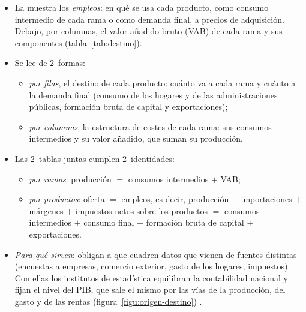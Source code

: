 \documentclass[11pt]{article}
\begin{document}
\begin{itemize}
\item La  muestra los \emph{empleos}: en qué se usa cada producto, como consumo intermedio de cada rama o como demanda final, a precios de adquisición. Debajo, por columnas, el valor añadido bruto (VAB) de cada rama y sus componentes (tabla~\ref{tab:destino}).
\item Se lee de 2~formas:
  \begin{itemize}
  \item \emph{por filas}, el destino de cada producto: cuánto va a cada rama y cuánto a la demanda final (consumo de los hogares y de las administraciones públicas, formación bruta de capital y exportaciones);
  \item \emph{por columnas}, la estructura de costes de cada rama: sus consumos intermedios y su valor añadido, que suman su producción.
  \end{itemize}
\item Las 2~tablas juntas cumplen 2~identidades\nocite{Eurostat2013SEC2010}:
  \begin{itemize}
  \item \emph{por ramas}: producción $=$ consumos intermedios $+$ VAB;
  \item \emph{por productos}: oferta $=$ empleos, es decir, producción $+$ importaciones $+$ márgenes $+$ impuestos netos sobre los productos $=$ consumos intermedios $+$ consumo final $+$ formación bruta de capital $+$ exportaciones.
  \end{itemize}
\item \emph{Para qué sirven}: obligan a que cuadren datos que vienen de fuentes distintas (encuestas a empresas, comercio exterior, gasto de los hogares, impuestos). Con ellas los institutos de estadística equilibran la contabilidad nacional y fijan el nivel del PIB, que sale el mismo por las vías de la producción, del gasto y de las rentas (figura~\ref{figu:origen-destino}) .
\end{itemize}
\end{document}
